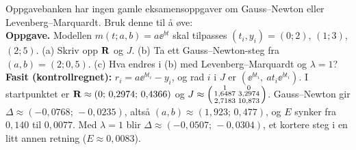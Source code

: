 \begin{oving}
Oppgavebanken har ingen gamle eksamensoppgaver om Gauss--Newton eller Levenberg--Marquardt. Bruk denne til å øve:\\
\textbf{Oppgave.} Modellen $m(t;a,b)=a\ee^{bt}$ skal tilpasses $(t_i,y_i)=(0;2)$, $(1;3)$, $(2;5)$. (a) Skriv opp $\mathbf{R}$ og $J$. (b) Ta ett Gauss--Newton-steg fra $(a,b)=(2;0{,}5)$. (c) Hva endres i (b) med Levenberg--Marquardt og $\lambda=1$?\\
\textbf{Fasit (kontrollregnet):} $r_i=a\ee^{bt_i}-y_i$, og rad $i$ i $J$ er $(\ee^{bt_i},\ at_i\ee^{bt_i})$. I startpunktet er $\mathbf{R}\approx(0;\,0{,}2974;\,0{,}4366)$ og $J\approx\begin{psmallmatrix}1&0\\1{,}6487&3{,}2974\\2{,}7183&10{,}873\end{psmallmatrix}$. Gauss--Newton gir $\Delta\approx(-0{,}0768;\,-0{,}0235)$, altså $(a,b)\approx(1{,}923;\,0{,}477)$, og $E$ synker fra $0{,}140$ til $0{,}0077$. Med $\lambda=1$ blir $\Delta\approx(-0{,}0507;\,-0{,}0304)$, et kortere steg i en litt annen retning ($E\approx0{,}0083$).
\end{oving}
